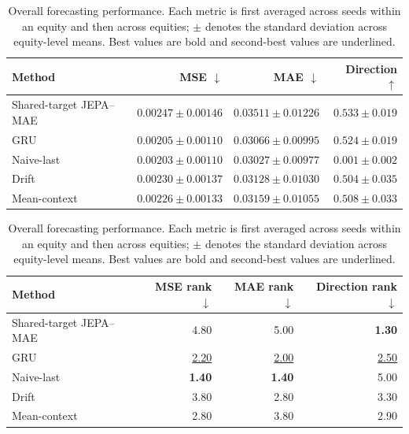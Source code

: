 \begin{table}[t]
\centering
\small
\caption{Overall forecasting performance. Each metric is first averaged across seeds within an equity and then across equities; $\pm$ denotes the standard deviation across equity-level means. Best values are bold and second-best values are underlined.}
\label{tab:main_metrics}
\begin{tabular}{lrrr}
\toprule
Method & MSE $\downarrow$ & MAE $\downarrow$ & Direction $\uparrow$ \\
\midrule
Shared-target JEPA--MAE & $0.00247 \pm 0.00146$ & $0.03511 \pm 0.01226$ & \textbf{$0.533 \pm 0.019$} \\
GRU & \underline{$0.00205 \pm 0.00110$} & \underline{$0.03066 \pm 0.00995$} & \underline{$0.524 \pm 0.019$} \\
Naive-last & \textbf{$0.00203 \pm 0.00110$} & \textbf{$0.03027 \pm 0.00977$} & $0.001 \pm 0.002$ \\
Drift & $0.00230 \pm 0.00137$ & $0.03128 \pm 0.01030$ & $0.504 \pm 0.035$ \\
Mean-context & $0.00226 \pm 0.00133$ & $0.03159 \pm 0.01055$ & $0.508 \pm 0.033$ \\
\bottomrule
\end{tabular}
\par\medskip
\begin{tabular}{lrrr}
\toprule
Method & MSE rank $\downarrow$ & MAE rank $\downarrow$ & Direction rank $\downarrow$ \\
\midrule
Shared-target JEPA--MAE & 4.80 & 5.00 & \textbf{1.30} \\
GRU & \underline{2.20} & \underline{2.00} & \underline{2.50} \\
Naive-last & \textbf{1.40} & \textbf{1.40} & 5.00 \\
Drift & 3.80 & 2.80 & 3.30 \\
Mean-context & 2.80 & 3.80 & 2.90 \\
\bottomrule
\end{tabular}
\end{table}

